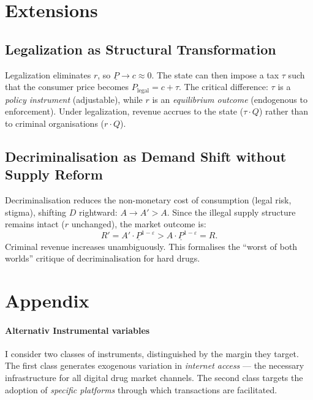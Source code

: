 \documentclass[12pt, a4paper]{article}
\begin{document}
\section{Extensions}

\subsection{Legalization as Structural Transformation}

Legalization eliminates $r$, so $\underline{P} \to c \approx 0$. The state can then impose a tax $\tau$ such that the consumer price becomes $P_{\text{legal}} = c + \tau$. The critical difference: $\tau$ is a \textit{policy instrument} (adjustable), while $r$ is an \textit{equilibrium outcome} (endogenous to enforcement). Under legalization, revenue accrues to the state ($\tau \cdot Q$) rather than to criminal organisations ($r \cdot Q$).

\subsection{Decriminalisation as Demand Shift without Supply Reform}

Decriminalisation reduces the non-monetary cost of consumption (legal risk, stigma), shifting $D$ rightward: $A \to A' > A$. Since the illegal supply structure remains intact ($r$ unchanged), the market outcome is:
\begin{equation}
R' = A' \cdot \underline{P}^{1-\varepsilon} > A \cdot \underline{P}^{1-\varepsilon} = R.
\end{equation}
Criminal revenue increases unambiguously. This formalises the ``worst of both worlds'' critique of decriminalisation for hard drugs.







\section{Appendix}

\paragraph{Alternativ Instrumental variables}
\label{par:alternativ}
I consider two classes of instruments, distinguished by the 
margin they target. The first class generates exogenous 
variation in \textit{internet access} --- the necessary 
infrastructure for all digital drug market channels. The 
second class targets the adoption of \textit{specific 
platforms} through which transactions are facilitated.
\end{document}
